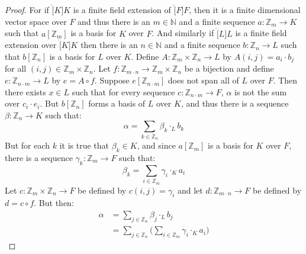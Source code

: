 \documentclass{article}                                                        %
\begin{document}
        \begin{proof}
            For if $\ring[K]{K}$ is a finite field extension of $\ring[F]{F}$,
            then it is a finite dimensional vector space over $F$ and thus there
            is an $m\in\mathbb{N}$ and a finite sequence
            $a:\mathbb{Z}_{m}\rightarrow{K}$ such that $a[\mathbb{Z}_{m}]$ is a
            basis for $K$ over $F$. And similarly if $\ring[L]{L}$ is a finite
            field extension over $\ring[K]{K}$ then there is an $n\in\mathbb{N}$
            and a finite sequence $b:\mathbb{Z}_{n}\rightarrow{L}$ such that
            $b[\mathbb{Z}_{n}]$ is a basis for $L$ over $K$. Define
            $A:\mathbb{Z}_{m}\times\mathbb{Z}_{n}\rightarrow{L}$ by
            $A(i,j)=a_{i}\cdot{b}_{j}$ for all
            $(i,j)\in\mathbb{Z}_{m}\times\mathbb{Z}_{n}$. Let
            $f:\mathbb{Z}_{m\cdot{n}}\rightarrow%
             \mathbb{Z}_{m}\times\mathbb{Z}_{n}$ be a bijection and define
            $e:\mathbb{Z}_{n\cdot{m}}\rightarrow{L}$ by $e=A\circ{f}$. Suppose
            $e[\mathbb{Z}_{n\cdot{m}}]$ does not span all of $L$ over $F$. Then
            there exists $x\in{L}$ such that for every sequence
            $c:\mathbb{Z}_{n\cdot{m}}\rightarrow{F}$, $\alpha$ is not the
            sum over $c_{i}\cdot{e}_{i}$. But $b[\mathbb{Z}_{n}]$ forms a basis
            of $L$ over $K$, and thus there is a sequence
            $\beta:\mathbb{Z}_{n}\rightarrow{K}$ such that:
            \begin{equation}
                \alpha=\sum_{k\in\mathbb{Z}_{n}}\beta_{k}\cdot_{L}{b}_{k}
            \end{equation}
            But for each $k$ it is true that $\beta_{k}\in{K}$, and since
            $a[\mathbb{Z}_{m}]$ is a basis for $K$ over $F$, there is a sequence
            $\gamma_{k}:\mathbb{Z}_{m}\rightarrow{F}$ such that:
            \begin{equation}
                \beta_{k}=\sum_{i\in\mathbb{Z}_{m}}\gamma_{i}\cdot_{K}a_{i}
            \end{equation}
            Let $c:\mathbb{Z}_{m}\times\mathbb{Z}_{n}\rightarrow{F}$ be defined
            by $c(i,j)=\gamma_{i}$ and let
            $d:\mathbb{Z}_{m\cdot{n}}\rightarrow{F}$ be defined by
            $d=c\circ{f}$. But then:
            \begin{align}
                \alpha&=\sum_{j\in\mathbb{Z}_{n}}\beta_{j}\cdot_{L}b_{j}\\
                &=\sum_{j\in\mathbb{Z}_{n}}\Big(
                    \sum_{i\in\mathbb{Z}_{m}}\gamma_{i}\cdot_{K}a_{i}\Big)

\end{align}
\end{proof}
\end{document}
